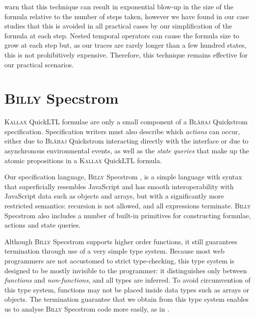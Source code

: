 \documentclass[sigplan,nonacm,10pt]{acmart}
\makeatletter
\newcommand{\Quickstrom}[0]{%
  \if@ACM@anonymous%
  \textsc{Bl\aa{}haj}%
  \else%
  Quickstrom%
  \fi\xspace}
\newcommand{\Specstrom}[0]{%
  \if@ACM@anonymous%
  \textsc{Billy}%
  \else%
  Specstrom%
  \fi\xspace}
\newcommand{\QuickLTL}[0]{%
    \if@ACM@anonymous%
    \textsc{Kallax}%
    \else%
    QuickLTL%
    \fi\xspace}
\makeatother
\begin{document}
\citet{rosu} warn that this technique can result in
exponential blow-up in the size of the formula relative to the number of steps taken,  however we have found in our case studies that this is avoided in all
practical cases by our simplification of the formula at each step. Nested temporal operators can cause the formula size to grow at each step but, as our traces are rarely
longer than a few hundred states, this is not prohibitively expensive. Therefore, this technique remains effective for our practical scenarios.

\section{\Specstrom}\label{sec:specstrom}

\QuickLTL formulae are only a small component of a \Quickstrom specification. Specification writers must also describe which \emph{actions} can occur, either due to \Quickstrom interacting directly with the interface or
due to asynchronous environmental events, as well as the \emph{state queries} that make up the atomic propositions in a \QuickLTL formula.

Our specification language, \Specstrom, is a simple language with syntax that superficially resembles JavaScript and has smooth interoperability with JavaScript data such as objects and arrays, but with a significantly more
restricted semantics: recursion is not allowed, and all expressions terminate.
\Specstrom also includes a number of built-in primitives for constructing formulae, actions and state queries.

Although \Specstrom supports higher order functions, it still guarantees termination through use of a very simple type system.
Because most web programmers are not accustomed to strict type-checking, this type system is designed to be mostly invisible to
the programmer: it distinguishes only between \emph{functions} and \emph{non-functions}, and all types are inferred. To avoid circumvention
of this type system, functions may not be
placed inside data types such as arrays or objects. The termination guarantee that we obtain from this type system enables us to
analyse \Specstrom code more easily, as in .
\end{document}
